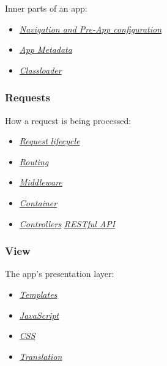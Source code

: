 \documentclass[letterpaper,10pt,english]{sphinxmanual}
\begin{document}
Inner parts of an app:
\begin{itemize}
\item {} 
{\hyperref[app/init::doc]{\emph{Navigation and Pre-App configuration}}}

\item {} 
{\hyperref[app/info::doc]{\emph{App Metadata}}}

\item {} 
{\hyperref[app/classloader::doc]{\emph{Classloader}}}

\end{itemize}


\subsubsection{Requests}
\label{app/index:requests}
How a request is being processed:
\begin{itemize}
\item {} 
{\hyperref[app/request::doc]{\emph{Request lifecycle}}}

\item {} 
{\hyperref[app/routes::doc]{\emph{Routing}}}

\item {} 
{\hyperref[app/middleware::doc]{\emph{Middleware}}}

\item {} 
{\hyperref[app/container::doc]{\emph{Container}}}

\item {} 
{\hyperref[app/controllers::doc]{\emph{Controllers}}} \textbar{} {\hyperref[app/api::doc]{\emph{RESTful API}}}

\end{itemize}


\subsubsection{View}
\label{app/index:view}
The app's presentation layer:
\begin{itemize}
\item {} 
{\hyperref[app/templates::doc]{\emph{Templates}}}

\item {} 
{\hyperref[app/js::doc]{\emph{JavaScript}}}

\item {} 
{\hyperref[app/css::doc]{\emph{CSS}}}

\item {} 
{\hyperref[app/l10n::doc]{\emph{Translation}}}

\end{itemize}
\end{document}
